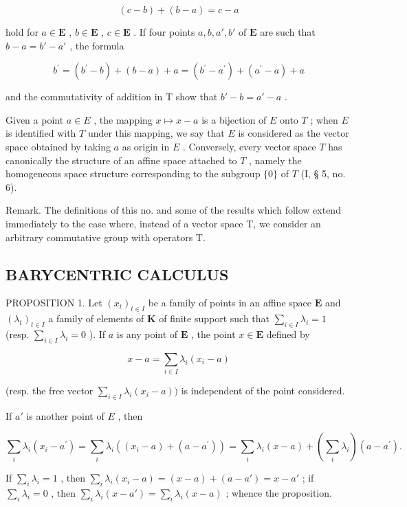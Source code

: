 \[
(c - b) + (b - a) = c - a
\]

hold for \(a \in \mathbf{E}\) , \(b \in \mathbf{E}\) , \(c \in \mathbf{E}\) . If four points \(a, b, a', b'\) of \(\mathbf{E}\) are such that \(b - a = b' - a'\) , the formula

\[
b ^ {\prime} = \left(b ^ {\prime} - b\right) + (b - a) + a = \left(b ^ {\prime} - a ^ {\prime}\right) + \left(a ^ {\prime} - a\right) + a
\]

and the commutativity of addition in T show that \(b' - b = a' - a\) .

Given a point \(a \in E\) , the mapping \(x \mapsto x - a\) is a bijection of \(E\) onto \(T\) ; when \(E\) is identified with \(T\) under this mapping, we say that \(E\) is considered as the vector space obtained by taking \(a\) as origin in \(E\) . Conversely, every vector space \(T\) has canonically the structure of an affine space attached to \(T\) , namely the homogeneous space structure corresponding to the subgroup \(\{0\}\) of \(T\) (I, § 5, no. 6).

Remark. The definitions of this no. and some of the results which follow extend immediately to the case where, instead of a vector space T, we consider an arbitrary commutative group with operators T.

\subsection{BARYCENTRIC CALCULUS}

PROPOSITION 1. Let \((x_{t})_{t\in I}\) be a family of points in an affine space \(\mathbf{E}\) and \((\lambda_t)_{t\in I}\) a family of elements of \(\mathbf{K}\) of finite support such that \(\sum_{i\in I}\lambda_i = 1\) (resp. \(\sum_{i\in I}\lambda_i = 0\) ). If \(a\) is any point of \(\mathbf{E}\) , the point \(x\in \mathbf{E}\) defined by

\[
x - a = \sum_ {i \in I} \lambda_ {i} (x _ {i} - a)
\]

(resp. the free vector \(\sum_{i\in I}\lambda_i(x_i - a))\) is independent of the point considered.

If \(a'\) is another point of \(E\) , then

\[
\sum_ {i} \lambda_ {i} (x _ {i} - a ^ {\prime}) = \sum_ {i} \lambda_ {i} ((x _ {i} - a) + (a - a ^ {\prime})) = \sum_ {i} \lambda_ {i} (x - a) + \left(\sum_ {i} \lambda_ {i}\right) (a - a ^ {\prime}).
\]

If \(\sum_{i}\lambda_{i} = 1\) , then \(\sum_{i}\lambda_{i}(x_{i} - a) = (x - a) + (a - a') = x - a'\) ; if \(\sum_{i}\lambda_{i} = 0\) , then \(\sum_{i}\lambda_{i}(x - a') = \sum_{i}\lambda_{i}(x - a)\) ; whence the proposition.

